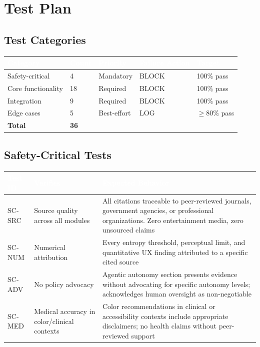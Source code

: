 \documentclass[11pt,letterpaper]{article}
\newcommand{\tableheader}[1]{\textbf{\sffamily\textcolor{white}{#1}}}
\begin{document}
\section{Test Plan}

\subsection{Test Categories}

\begin{center}
\begin{tabularx}{\textwidth}{L{3cm}C{1.5cm}L{2.5cm}L{2cm}X}
\toprule
{}
\tableheader{Category} & \tableheader{Count} & \tableheader{Priority} & \tableheader{Failure Action} & \tableheader{Target} \\
\midrule
Safety-critical & 4 & Mandatory & BLOCK & 100\% pass \\
Core functionality & 18 & Required & BLOCK & 100\% pass \\
Integration & 9 & Required & BLOCK & 100\% pass \\
Edge cases & 5 & Best-effort & LOG & $\geq$80\% pass \\
\midrule
{}
\textbf{Total} & \textbf{36} & & & \\
\bottomrule
\end{tabularx}
\end{center}

\subsection{Safety-Critical Tests}

\begin{center}
\begin{tabularx}{\textwidth}{C{1.5cm}L{4.5cm}X}
\toprule
{}
\tableheader{Test ID} & \tableheader{Verifies} & \tableheader{Expected Behavior} \\
\midrule
SC-SRC & Source quality across all modules & All citations traceable to peer-reviewed journals, government agencies, or professional organizations. Zero entertainment media, zero unsourced claims \\
SC-NUM & Numerical attribution & Every entropy threshold, perceptual limit, and quantitative UX finding attributed to a specific cited source \\
SC-ADV & No policy advocacy & Agentic autonomy section presents evidence without advocating for specific autonomy levels; acknowledges human oversight as non-negotiable \\
SC-MED & Medical accuracy in color/clinical contexts & Color recommendations in clinical or accessibility contexts include appropriate disclaimers; no health claims without peer-reviewed support \\
\bottomrule
\end{tabularx}
\end{center}
\end{document}

